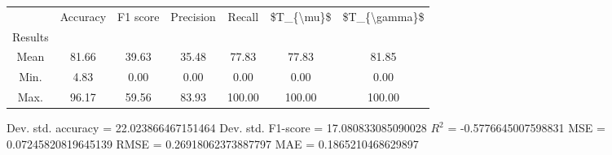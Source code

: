 \begin{tabular}{|c|c|c|c|c|c|c|}
\toprule
{} &  Accuracy &  F1 score &  Precision &  Recall &  \$T\_\{\textbackslash mu\}\$ &  \$T\_\{\textbackslash gamma\}\$ \\
Results &           &           &            &         &            &               \\
\hline
Mean    &     81.66 &     39.63 &      35.48 &   77.83 &      77.83 &         81.85 \\
Min.    &      4.83 &      0.00 &       0.00 &    0.00 &       0.00 &          0.00 \\
Max.    &     96.17 &     59.56 &      83.93 &  100.00 &     100.00 &        100.00 \\
\bottomrule
\end{tabular}

 Dev. std. accuracy = 22.023866467151464
 Dev. std. F1-score = 17.080833085090028
 $R^2$ = -0.5776645007598831
 MSE = 0.07245820819645139
 RMSE = 0.26918062373887797
 MAE = 0.1865210468629897